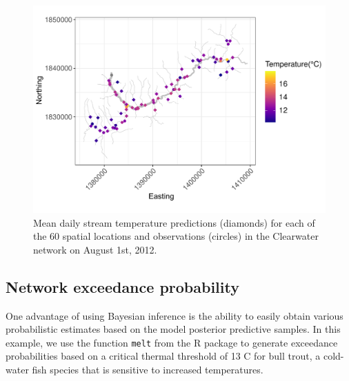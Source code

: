 \begin{figure}[htbp]
  \centering
   \includegraphics[width=5.75in]{./Figs_Pay/preds_network.pdf}
  \caption{
  Mean daily stream temperature predictions (diamonds) for each of the 60 spatial locations and observations (circles)  in the Clearwater network on August 1st, 2012. 
  }
  \label{figure:preds_network}
\end{figure}




\subsection*{Network exceedance probability}

One advantage of using Bayesian inference is the ability to easily obtain various probabilistic estimates based on the model posterior predictive samples.
In this example, we use the function \texttt{melt} from the R package  \citep{hadleyreshape2} to generate exceedance probabilities based on a critical thermal threshold of 13 \textdegree{}C for bull trout, a cold-water fish species that is sensitive to increased temperatures.



